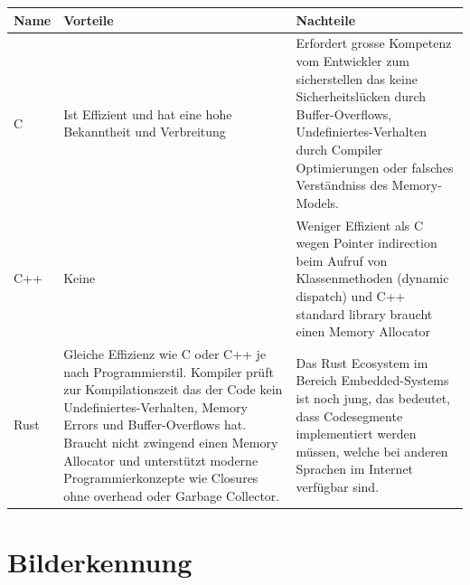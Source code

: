 \documentclass[a4paper]{report}
\begin{document}
\vspace{1em}
\noindent
\begin{tabular}{|p{}|p{}|p{}|}
  \hline
  \textbf{Name} & \textbf{Vorteile} & \textbf{Nachteile} \\
  \hline
  C & Ist Effizient und hat eine hohe Bekanntheit und Verbreitung & Erfordert grosse Kompetenz vom Entwickler zum sicherstellen das keine Sicherheitslücken durch Buffer-Overflows, Undefiniertes-Verhalten durch Compiler Optimierungen oder falsches Verständniss des Memory-Models. \\
  \hline
  C++ & Keine & Weniger Effizient als C wegen Pointer indirection beim Aufruf von Klassenmethoden (dynamic dispatch) und C++ standard library braucht einen Memory Allocator \\
  \hline
  Rust & Gleiche Effizienz wie C oder C++ je nach Programmierstil. Kompiler prüft zur Kompilationszeit das der Code kein Undefiniertes-Verhalten, Memory Errors und Buffer-Overflows hat. Braucht nicht zwingend einen Memory Allocator und unterstützt moderne Programmierkonzepte wie Closures ohne overhead oder Garbage Collector. & Das Rust Ecosystem im Bereich Embedded-Systems ist noch jung, das bedeutet, dass Codesegmente implementiert werden müssen, welche bei anderen Sprachen im Internet verfügbar sind.\\
  \hline
\end{tabular}

\section{Bilderkennung}
\end{document}
